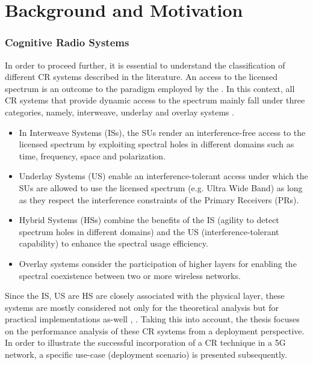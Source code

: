 \section{Background and Motivation}
\label{sec:mot}

\subsubsection*{Cognitive Radio Systems}
In order to proceed further, it is essential to understand the classification of different CR systems described in the literature. An access to the licensed spectrum is an outcome to the paradigm employed by the . In this context, all CR systems that provide dynamic access to the spectrum mainly fall under three categories, namely, interweave, underlay and overlay systems \cite{Goldsmith09}. 
\begin{itemize}
\item In Interweave Systems (ISs), the SUs render an interference-free access to the licensed spectrum by exploiting spectral holes in different domains such as time, frequency, space and polarization. 
\item Underlay Systems (US) enable an interference-tolerant access under which the SUs are allowed to use the licensed spectrum (e.g. Ultra Wide Band) as long as they respect the interference constraints of the Primary Receivers (PRs). 
\item Hybrid Systems (HSs) combine the benefits of the IS (agility to detect spectrum holes in different domains) and the US (interference-tolerant capability) to enhance the spectral usage efficiency.  
\item Overlay systems consider the participation of higher layers for enabling the spectral coexistence between two or more wireless networks. 
\end{itemize}
Since the IS, US are HS are closely associated with the physical layer, these systems are mostly considered not only for the theoretical analysis but for practical implementations as-well , \cite{Cabric04, Cabric06, Kim10}. Taking this into account, the thesis focuses on the performance analysis of these CR systems from a deployment perspective. In order to illustrate the successful incorporation of a CR technique in a 5G network, a specific use-case (deployment scenario) is presented subsequently. 




